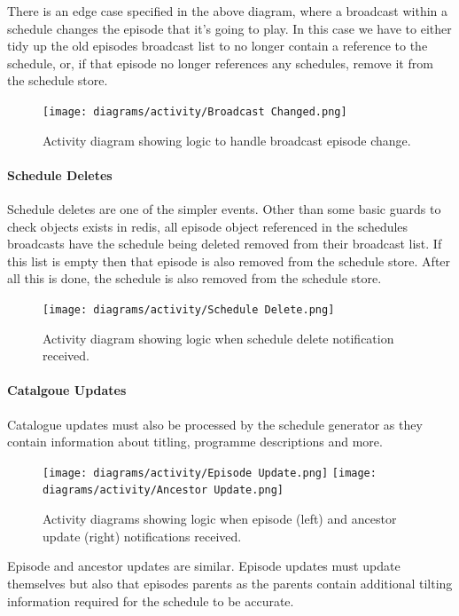   There is an edge case specified in the above diagram, where a broadcast within a schedule changes the episode that it's going to play. 
  In this case we have to either tidy up the old episodes broadcast list to no longer contain a reference to the schedule, or, if that episode no 
  longer references any schedules, remove it from the schedule store.

  \begin{figure}[H]
    \centering
    \texttt{[image: diagrams/activity/Broadcast Changed.png]}
    \caption{Activity diagram showing logic to handle broadcast episode change.}
    \label{fig:broadCastChangeActivity}
  \end{figure}

  \newpage
  \paragraph{Schedule Deletes}
  Schedule deletes are one of the simpler events. Other than some basic guards to check objects exists in redis, all episode object referenced in 
  the schedules broadcasts have the schedule being deleted removed from their broadcast list. If this list is empty then that episode is also removed
  from the schedule store. After all this is done, the schedule is also removed from the schedule store.

  \begin{figure}[H]
    \centering
    \texttt{[image: diagrams/activity/Schedule Delete.png]}
    \caption{Activity diagram showing logic when schedule delete notification received.}
    \label{fig:scheduleDeleteActivity}
  \end{figure}

  \newpage
  \paragraph{Catalgoue Updates}
  Catalogue updates must also be processed by the schedule generator as they contain information about titling, programme descriptions and more.

  \begin{figure}[H]
    \centering
    \texttt{[image: diagrams/activity/Episode Update.png]}
    \texttt{[image: diagrams/activity/Ancestor Update.png]}
    \caption{Activity diagrams showing logic when episode (left) and ancestor update (right) notifications received.}
    \label{fig:scheduleUpdateCatalogueActivity}
  \end{figure}

  Episode and ancestor updates are similar. Episode updates must update themselves but also that episodes parents as
  the parents contain additional tilting information required for the schedule to be accurate.

